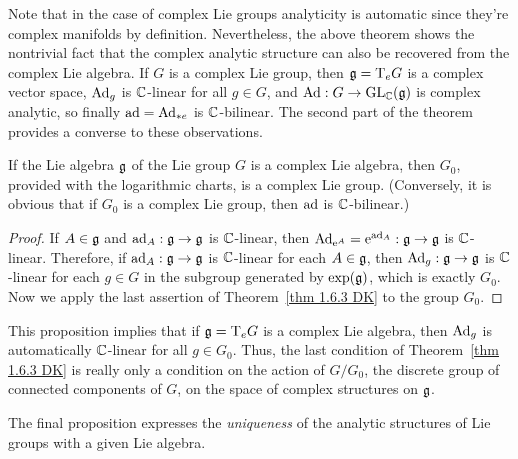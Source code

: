 \begin{rem}
    Note that in the case of complex Lie groups analyticity is automatic since they're complex manifolds by definition. Nevertheless, the above theorem shows the nontrivial fact that the complex analytic structure can also be recovered from the complex Lie algebra. If $G$ is a complex Lie group, then $\mathfrak{g}=\mathrm{T}_e G$ is a complex vector space, $\mathrm{Ad}_g$ is $\mathbb{C}$-linear for all $g\in G$, and $\mathrm{Ad}:G\to \operatorname{GL}_{\mathbb{C}}(\mathfrak{g})$ is complex analytic, so finally $\mathrm{ad}=\mathrm{Ad}_{\ast e}$ is $\mathbb{C}$-bilinear. The second part of the theorem provides a converse to these observations.
\end{rem}

\begin{prop}[{{\cite[Prop.~1.9.4]{DK}}}]
    If the Lie algebra $\mathfrak{g}$ of the Lie group $G$ is a complex Lie algebra, then $G_0$, provided with the logarithmic charts, is a complex Lie group. (Conversely, it is obvious that if $G_0$ is a complex Lie group, then $\mathrm{ad}$ is $\mathbb{C}$-bilinear.)
\end{prop}
\begin{proof}
    If $A\in\mathfrak{g}$ and $\mathrm{ad}_A:\mathfrak{g}\to \mathfrak{g}$ is $\mathbb{C}$-linear, then $\mathrm{Ad}_{\mathrm{e}^A}=\mathrm{e}^{\mathrm{ad}_A}:\mathfrak{g}\to\mathfrak{g}$ is $\mathbb{C}$-linear. Therefore, if $\mathrm{ad}_A:\mathfrak{g}\to\mathfrak{g}$ is $\mathbb{C}$-linear for each $A\in\mathfrak{g}$, then $\mathrm{Ad}_g:\mathfrak{g}\to\mathfrak{g}$ is $\mathbb{C}$-linear for each $g\in G$ in the subgroup generated by $\exp(\mathfrak{g})$, which is exactly $G_0$. Now we apply the last assertion of Theorem~\ref{thm 1.6.3 DK} to the group $G_0$.
\end{proof}

This proposition implies that if $\mathfrak{g}=\mathrm{T}_e G$ is a complex Lie algebra, then $\mathrm{Ad}_g$ is automatically $\mathbb{C}$-linear for all $g\in G_0$. Thus, the last condition of Theorem~\ref{thm 1.6.3 DK} is really only a condition on the action of $G\slash G_0$, the discrete group of connected components of $G$, on the space of complex structures on $\mathfrak{g}$.

The final proposition expresses the \emph{uniqueness} of the analytic structures of Lie groups with a given Lie algebra.

